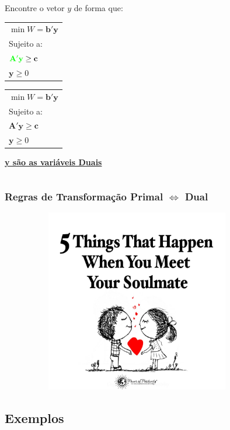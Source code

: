 \documentclass{beamer}
\begin{document}
\begin{frame}
\begin{columns}
\begin{column}{4cm}
\begin{mdframed}[backgroundcolor=red!50]
				Encontre o vetor \textbf{$y$} de forma que:
				\only<1>
				{
					\begin{table}
						\begin{tabular}{l}
							$ \min W = \mathbf{b'y} $ \\
							Sujeito a: \\
							$ {\color{green} \mathbf{A'y}} \ge \mathbf{c}$ \\
							$ \mathbf{y} \ge 0$ \\
						\end{tabular}
					\end{table}
				}
				{
					\begin{table}
						\begin{tabular}{l}
							$ \min W = \mathbf{b'y} $ \\
							Sujeito a: \\
							$ \mathbf{A'y} \ge \mathbf{c}$ \\
							$ \mathbf{y} \ge 0$ \\
						\end{tabular}
					\end{table}
				}
			\end{mdframed}
			\underline{\textbf{y são as variáveis Duais}}
		\end{column}
	\end{columns}	
\end{frame}

\begin{frame}
	\frametitle{Regras de Transformação Primal $\Leftrightarrow$ Dual}
	\centering
	\includegraphics[width=12cm,height=8cm]{soulmate.jpg}
\end{frame}

\subsection{Exemplos}
\end{document}
